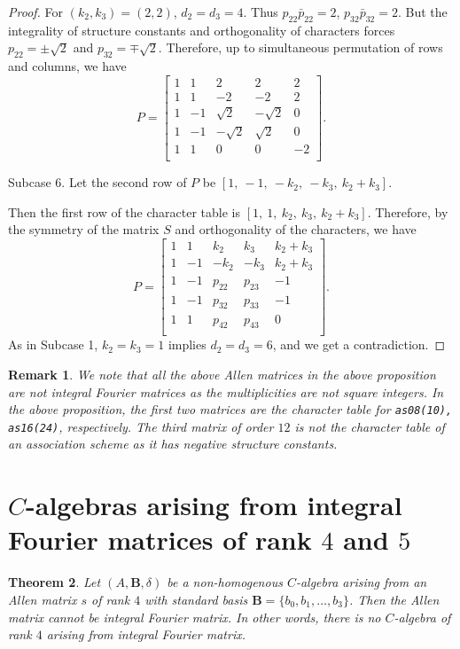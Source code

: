 \documentclass[12pt]{amsart}
\newtheorem{thm}{Theorem}
\newtheorem{remark}[thm]{Remark}
\begin{document}
\begin{proof}
\medskip

For $(k_2,k_3)=(2,2)$, $d_2=d_3=4$. Thus $p_{22}\bar p_{22}=2$, $p_{32}\bar p_{32}=2$. But the integrality of structure constants and orthogonality of characters forces $p_{22}=  \pm\sqrt{2}$  and $p_{32}=  \mp\sqrt{2}$.
Therefore, up to simultaneous permutation of rows and columns, 
we have
$$P=\left[
   \begin{array}{ccccc}
     1 & 1 & 2 &2&2\\
     1 & 1 &  -2 &  -2&2\\
       1 & -1 &  \sqrt{2} &-\sqrt{2}&0\\
     1 & -1 & -\sqrt{2} & \sqrt{2}& 0\\
     1 &  1 &  0&  0& -2\\
   \end{array}\right].
$$

\medskip

Subcase 6. Let the second row of $P$ be $[1, ~ -1,~     -k_2,   ~-k_3,~ k_2+k_3]$.

\smallskip

Then the first row of the character table is $[1,~ 1,~ k_2,~ k_3, ~k_2+k_3]$.
Therefore, by the symmetry of the matrix $S$ and orthogonality of the characters, we have
$$P=\left[
   \begin{array}{ccccc}
     1 & 1 & k_2 &k_3&k_2+k_3\\
     1 & -1 &    -k_2 &  -k_3&k_2+k_3\\
      1 &  -1 &  p_{22}&  p_{23}& -1\\
     1 &  -1 &  p_{32}&  p_{33}& -1\\
     1 &  1 &  p_{42}&  p_{43}& 0\\
   \end{array}\right].
$$
As in Subcase 1, $k_2=k_3=1$ implies $d_2=d_3=6$, and we get a contradiction.
\end{proof}

\begin{remark}\rm
We note that all the above Allen matrices in the above proposition are not integral Fourier matrices as the multiplicities are not square integers. In the above proposition, the first two matrices are the character table for {\tt as08(10), as16(24)}, respectively. The third matrix of order $12$ is not the character table of  an association scheme as it has negative structure constants.
\end{remark}

\section{$C$-algebras arising from integral Fourier matrices of rank $4$ and $5$}
\begin{thm}\label{FourDifferentDegreesThm4}Let $(A,{{\mathbf B}}, \delta)$ be a non-homogenous $C$-algebra arising from an Allen matrix $s$  of rank $4$ with standard  basis ${{\mathbf B}}=\{b_0,b_1,\hdots, b_3\}$. Then the Allen matrix cannot be integral Fourier matrix. In other words, there is no $C$-algebra of rank $4$ arising from integral Fourier matrix.
\end{thm}
\end{document}
